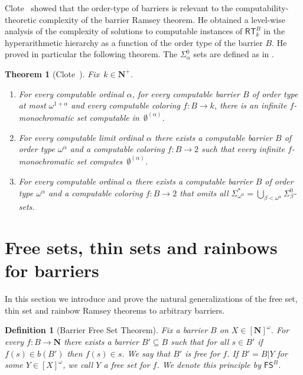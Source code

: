 \documentclass{amsart}
\theoremstyle{plain}
\theoremstyle{plain}
\newtheorem{theorem}{Theorem}
\newtheorem*{definition}{Definition}
\newcommand{\om}{\omega}
\newcommand{\al}{{\alpha}}
\newcommand\Nat{\mathbf{N}}
\newcommand\RT{\mathsf{RT}}
\newcommand\FreeS{\mathsf{FS}}
\begin{document}
Clote~\cite{Clote1984} showed that the order-type of barriers is relevant to the computability-theoretic complexity of the barrier Ramsey theorem. He obtained a level-wise analysis of the complexity of solutions to computable instances of $\RT^B_k$ in the hyperarithmetic hierarchy as a function of the order type of the barrier $B$. He proved in particular the following theorem. The $\Sigma^0_\al$ sets are defined as in \cite{Rogers1987}.

\begin{theorem}[Clote~\cite{Clote1984}]\label{thm:Clote}
Fix~$k \in \Nat^+$.
\begin{enumerate}
    \item For every computable ordinal $\alpha$, for every computable barrier $B$ of order type at most $\om^{1+\al}$ and every computable coloring $f : B \to k$, there is an infinite $f$-monochromatic set computable in~$\emptyset^{(\al)}$.
    \item For every computable limit ordinal $\alpha$ there exists a computable barrier $B$ of order type $\om^{\al}$ and a computable coloring $f : B \to 2$ such that every infinite $f$-monochromatic set computes~$\emptyset^{( \al)}$.
    \item For every computable ordinal $\alpha$ there exists a computable barrier $B$ of order type $\om^{\al}$ and a computable coloring $f : B \to 2$ that omits all $\Sigma_{\om^\al}^* = \bigcup_{\beta < \om^\alpha}\Sigma^0_\beta$-sets.
\end{enumerate}
\end{theorem}

\section{Free sets, thin sets and rainbows for barriers} \label{sec:up}

In this section we introduce and prove the natural generalizations of the free set, thin set and rainbow Ramsey theorems to arbitrary barriers.

\begin{definition}[Barrier Free Set Theorem]
Fix a barrier $B$ on $X\in [\Nat]^\omega$. For every $f:B \to \Nat$ there exists a barrier $B'\subseteq B$ such that for all $s \in B'$ if $f(s) \in b(B')$ then $f(s) \in s$. We say that $B'$ is free for $f$. If $B'=B\vert Y$ for some $Y\in [X]^\om$, we call $Y$ a free set for $f$.
We denote this principle by $\FreeS^B$. 
\end{definition}
\end{document}
